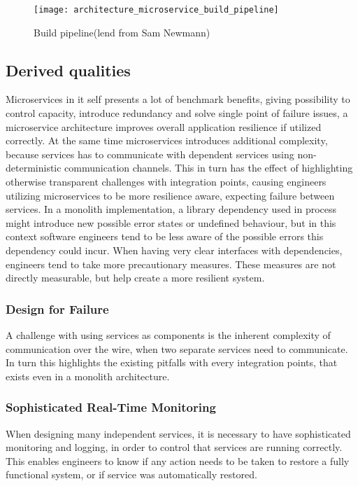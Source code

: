 \begin{figure}[!htb]
  \texttt{[image: architecture\_microservice\_build\_pipeline]}  
  \caption{Build pipeline(lend from Sam Newmann)}
  \label{fig:architecture_microservice_build_pipeline}
\end{figure}


\subsection{Derived qualities}
Microservices in it self presents a lot of benchmark benefits, giving possibility to control capacity, introduce redundancy and solve single point of failure issues, a microservice architecture improves overall application resilience if utilized correctly. At the same time microservices introduces additional complexity, because services has to communicate with dependent services using non-deterministic communication channels. This in turn has the effect of highlighting otherwise transparent challenges with integration points, causing engineers utilizing microservices to be more resilience aware, expecting failure between services. In a monolith implementation, a library dependency used in process might introduce new possible error states or undefined behaviour, but in this context software engineers tend to be less aware of the possible errors this dependency could incur. When having very clear interfaces with dependencies, engineers tend to take more precautionary measures. These measures are not directly measurable, but help create a more resilient system. 

\subsubsection*{Design for Failure}
A challenge with using services as components is the inherent complexity of communication over the wire, when two separate services need to communicate. In turn this highlights the existing pitfalls with every integration points, that exists even in a monolith architecture.

\subsubsection*{Sophisticated Real-Time Monitoring}
When designing many independent services, it is necessary to have sophisticated monitoring and logging, in order to control that services are running correctly. This enables engineers to know if any action needs to be taken to restore a fully functional system, or if service was automatically restored.

